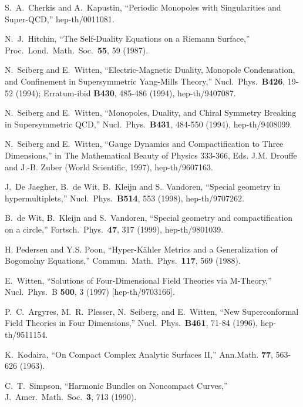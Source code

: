 \documentclass[a4paper,12pt, amsfonts, amssymb]{article}
\begin{document}
\begin{thebibliography}{99}
S.~A.~Cherkis and A.~Kapustin, ``Periodic Monopoles
with Singularities and \coordHE{} Super-QCD,'' hep-th/0011081.

N.~J.~Hitchin,
``The Self-Duality Equations on a Riemann Surface,''
Proc.\ Lond.\ Math.\ Soc.\ {\bf 55}, 59 (1987).


N.~Seiberg and E.~Witten, ``Electric-Magnetic Duality, Monopole Condensation, and Confinement in \coordHE{} Supersymmetric Yang-Mills Theory,'' Nucl.\ Phys.\ {\bf B426}, 19-52 (1994); Erratum-ibid {\bf B430}, 485-486 (1994), hep-th/9407087.

N.~Seiberg and E.~Witten, ``Monopoles, Duality, and Chiral Symmetry Breaking
in \coordHE{} Supersymmetric QCD,'' Nucl.\ Phys.\ {\bf B431}, 484-550 (1994), hep-th/9408099.

 N.~Seiberg and E.~Witten, ``Gauge Dynamics and
Compactification to Three Dimensions,'' in The Mathematical Beauty
of Physics 333-366, Eds. J.M. Drouffe and J.-B. Zuber (World
Scientific, 1997), hep-th/9607163.

J.~De Jaegher, B.~de Wit, B.~Kleijn and S.~Vandoren, ``Special
geometry in hypermultiplets,'' Nucl.\ Phys.\  {\bf B514}, 553
(1998), hep-th/9707262.

B.~de Wit, B.~Kleijn and S.~Vandoren, ``Special geometry and
compactification on a circle,'' Fortsch.\ Phys.\  {\bf 47}, 317
(1999), hep-th/9801039.

H. Pedersen and Y.S. Poon, ``Hyper-K\"ahler Metrics and a Generalization
of Bogomolny Equations,'' Commun.\ Math.\ Phys.\ {\bf 117}, 569 (1988).

 E.~Witten,
``Solutions of Four-Dimensional Field Theories via M-Theory,''
Nucl.\ Phys.\ B {\bf 500}, 3 (1997) [hep-th/9703166].

 P.~C.~Argyres, M.~R.~Plesser, N.~Seiberg, and E.~Witten,
``New \coordHE{} Superconformal Field Theories in Four Dimensions,''
Nucl.\ Phys.\ {\bf B461}, 71-84 (1996), hep-th/9511154.


K.~Kodaira, ``On Compact Complex Analytic Surfaces II,'' Ann.Math. {\bf 77}, 563-626 (1963).

 C.~T.~Simpson, ``Harmonic Bundles on Noncompact
Curves,'' J.\ Amer.\ Math.\ Soc.\ {\bf 3}, 713 (1990).

\end{thebibliography}
\end{document}
